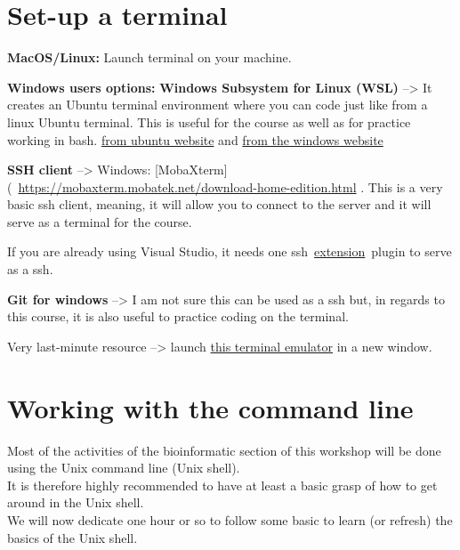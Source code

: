 \documentclass[
]{book}
\begin{document}
\section{Set-up a terminal}\label{set-up-a-terminal}

\textbf{MacOS/Linux:} Launch terminal on your machine.

\textbf{Windows users options:}
\textbf{Windows Subsystem for Linux (WSL)} --\textgreater{} It creates an Ubuntu terminal environment where you can code just like from a linux Ubuntu terminal. This is useful for the course as well as for practice working in bash. \href{https://ubuntu.com/wsl}{from ubuntu website} and \href{https://learn.microsoft.com/en-us/windows/wsl/install}{from the windows website}

\textbf{SSH client} --\textgreater{} Windows: {[}MobaXterm{]}(~\url{https://mobaxterm.mobatek.net/download-home-edition.html} . This is a very basic ssh client, meaning, it will allow you to connect to the server and it will serve as a terminal for the course.

If you are already using Visual Studio, it needs one ssh~\href{https://code.visualstudio.com/docs/remote/ssh}{extension}~plugin to serve as a ssh.

\textbf{Git for windows} --\textgreater{} I am not sure this can be used as a ssh but, in regards to this course, it is also useful to practice coding on the terminal.

Very last-minute resource --\textgreater{} launch \href{https://bellard.org/jslinux/vm.html?url=alpine-x86.cfg&mem=192}{this terminal emulator} in a new window.

\section{Working with the command line}\label{working-with-the-command-line}

Most of the activities of the bioinformatic section of this workshop will be done using the Unix command line (Unix shell).\\
It is therefore highly recommended to have at least a basic grasp of how to get around in the Unix shell.\\
We will now dedicate one hour or so to follow some basic to learn (or refresh) the basics of the Unix shell.
\end{document}
